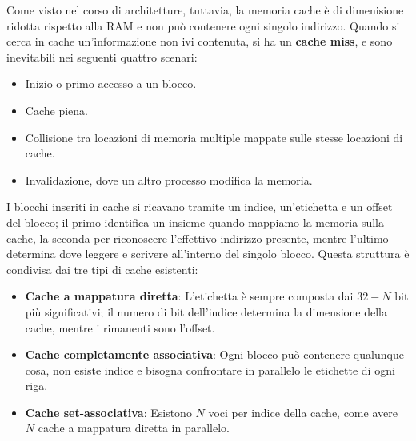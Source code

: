 \noindent Come visto nel corso di architetture, tuttavia, la memoria cache è di dimenisione ridotta rispetto alla RAM e non può contenere ogni singolo
indirizzo. Quando si cerca in cache un'informazione non ivi contenuta, si ha un \textbf{cache miss}, e sono inevitabili nei seguenti quattro scenari:
\begin{itemize}
    \item Inizio o primo accesso a un blocco.
    \item Cache piena.
    \item Collisione tra locazioni di memoria multiple mappate sulle stesse locazioni di cache.
    \item Invalidazione, dove un altro processo modifica la memoria.
\end{itemize}

\noindent I blocchi inseriti in cache si ricavano tramite un indice, un'etichetta e un offset del blocco; il primo identifica un insieme quando
mappiamo la memoria sulla cache, la seconda per riconoscere l'effettivo indirizzo presente, mentre l'ultimo determina dove leggere e scrivere
all'interno del singolo blocco. Questa struttura è condivisa dai tre tipi di cache esistenti: \begin{itemize}
    \item \textbf{Cache a mappatura diretta}: L'etichetta è sempre composta dai $32-N$ bit più significativi; il numero di bit dell'indice determina la
    dimensione della cache, mentre i rimanenti sono l'offset.
    \item \textbf{Cache completamente associativa}: Ogni blocco può contenere qualunque cosa, non esiste indice e bisogna confrontare in parallelo le
    etichette di ogni riga.
    \item \textbf{Cache set-associativa}: Esistono $N$ voci per indice della cache, come avere $N$ cache a mappatura diretta in parallelo.
\end{itemize}

